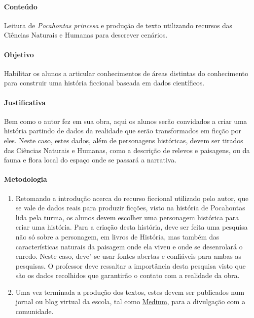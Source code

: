 \documentclass[12pt]{extarticle}
\begin{document}
 \paragraph{Conteúdo} Leitura de \emph{Pocahontas princesa} e produção de texto
 utilizando recursos das Ciências Naturais e Humanas para descrever cenários.

 \paragraph{Objetivo} Habilitar os alunos a articular conhecimentos de áreas
 distintas do conhecimento para construir uma história ficcional baseada
 em dados científicos.

 \paragraph{Justificativa} Bem como o autor fez em sua obra, aqui os alunos
 serão convidados a criar uma história partindo de dados da realidade que
 serão transformados em ficção por eles. Neste caso, estes dados, além de personagens
 históricas, devem ser tirados das Ciências Naturais e Humanas, como a descrição de
 relevos e paisagens, ou da fauna e flora local do espaço onde se passará a narrativa.

 \paragraph{Metodologia}
 	\begin{enumerate}
 		\item
 		Retomando a introdução acerca do recurso ficcional utilizado pelo
 		autor, que se vale de dados reais para produzir ficções, visto na história 
 		de Pocahontas lida pela turma, os alunos devem escolher uma personagem 
 		histórica para criar uma história. 
 		Para a criação desta história, deve ser feita uma pesquisa não só sobre
 		a personagem, em livros de História, mas também das características 
 		naturais da paisagem onde ela viveu e onde se desenrolará o enredo.
 		Neste caso, deve"-se usar fontes abertas e confiáveis para ambas as pesquisas.
 		O professor deve ressaltar a importância desta pesquisa visto que são os dados
 		recolhidos que garantirão o contato com a realidade da obra.
 		\item
 		Uma vez terminada a produção dos textos, estes devem ser publicados 
 		num jornal ou blog virtual da escola, tal como \href{medium.com}{Medium},
 		para a divulgação com a comunidade.

 	\end{enumerate}
\end{document}
